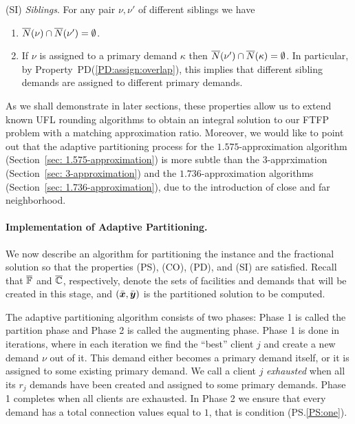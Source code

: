 \documentclass{llncs}
\begin{document}
\begin{description}
\begin{enumerate}
\begin{enumerate}
			\end{enumerate}

	\end{enumerate}
	
\item{(SI)} \emph{Siblings}. For any pair $\nu,\nu'$ of different siblings we have
  \begin{enumerate}

	\item \label{SI:siblings disjoint}
		  ${\overline{N}}(\nu)\cap {\overline{N}}(\nu') = \emptyset$.
		
	\item \label{SI:primary disjoint} If $\nu$ is assigned to a primary demand $\kappa$ then
 		${\overline{N}}(\nu')\cap {\overline{N}}(\kappa) = \emptyset$. In particular, by Property~PD(\ref{PD:assign:overlap}),
		this implies that different sibling demands are assigned to different primary demands.

	\end{enumerate}
	
\end{description}

As we shall demonstrate in later sections, these properties allow us
to extend known UFL rounding algorithms to obtain an integral solution
to our FTFP problem with a matching approximation ratio. Moreover, we
would like to point out that the adaptive partitioning process for the
$1.575$-approximation algorithm (Section~\ref{sec:
  1.575-approximation}) is more subtle than the $3$-apprximation
(Section~\ref{sec: 3-approximation}) and the $1.736$-approximation
algorithms (Section~\ref{sec: 1.736-approximation}), due to the
introduction of close and far neighborhood.


\paragraph{Implementation of Adaptive Partitioning.}
We now describe an algorithm for partitioning the instance
and the fractional solution so that the properties (PS),
(CO), (PD), and (SI) are satisfied.  Recall that
$\overline{\mathbb{F}}$ and $\overline{\mathbb{C}}$, respectively, denote the
sets of facilities and demands that will be created in this
stage, and $(\bar{\boldsymbol{x}},\bar{\boldsymbol{y}})$ is the partitioned solution
to be computed. 

The adaptive partitioning algorithm consists of two phases:
Phase 1 is called the partition phase and Phase 2 is called
the augmenting phase. Phase 1 is done in iterations, where
in each iteration we find the ``best'' client $j$ and create a
new demand $\nu$ out of it. This demand either becomes a
primary demand itself, or it is assigned to some existing
primary demand. We call a client $j$ \emph{exhausted} when
all its $r_j$ demands have been created and assigned to some
primary demands. Phase 1 completes when all clients are
exhausted. In Phase 2 we ensure that every demand has a
total connection values equal to $1$, that is condition (PS.\ref{PS:one}).
\end{document}

